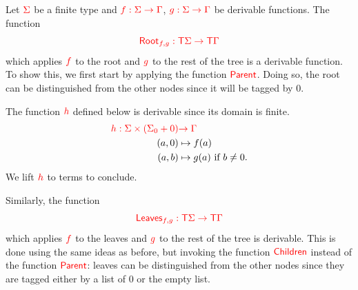 \noindent  \begin{example} Let ${\color{red}{\Sigma}}$ be a finite type and ${\color{red}{f:{\color{red}{\Sigma}}\to {\color{red}{\Gamma}}}}$, ${\color{red}{g: {\color{red}{\Sigma}}\to {\color{red}{\Gamma}}}}$ be derivable functions. The function $${\color{red}{\mathsf{Root}_{f,g} : {\color{red}{\mathsf T}}{\color{red}{\Sigma}}\to {\color{red}{\mathsf T}}{\color{red}{\Gamma}}}}$$
which applies ${\color{red}{f}}$ to the root and ${\color{red}{g}}$ to the rest of the tree is a derivable function.
To show this, we first start by applying the function ${\color{red}{\mathsf{Parent}}}$. Doing so, the root can be distinguished from the other nodes since it will be tagged by $0$.  

The function ${\color{red}{h}}$ defined below is derivable since its domain is finite. 
\begin{align*}
{\color{red}{h:{\color{red}{\Sigma}}\times({\color{red}{\Sigma}}_0+0)}}&{\color{red}{\to {\color{red}{\Gamma}}}}\\
  (a,0) &\mapsto f(a) \\
  (a,b) &\mapsto g(a) \text{ if } b\neq 0.
\end{align*}
We lift ${\color{red}{h}}$ to terms to conclude.

\smallskip
Similarly, the function $${\color{red}{\mathsf{Leaves}_{f,g} : {\color{red}{\mathsf T}}{\color{red}{\Sigma}}\to {\color{red}{\mathsf T}}{\color{red}{\Gamma}}}}$$
 which applies ${\color{red}{f}}$ to the leaves and ${\color{red}{g}}$ to the rest of the tree is derivable. This is done using the same ideas as before, but invoking the function ${\color{red}{\mathsf{Children}}}$ instead of the function ${\color{red}{\mathsf{Parent}}}$: leaves can be distinguished from the other nodes since they are tagged either by a list of $0$ or the empty list.
\end{example}


